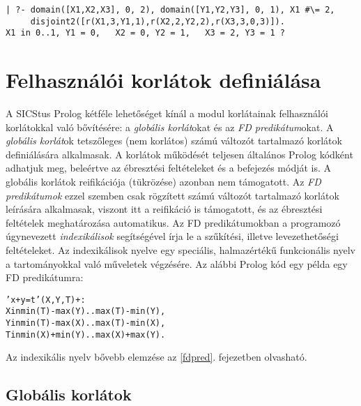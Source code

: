 \begin{verbatim}
| ?- domain([X1,X2,X3], 0, 2), domain([Y1,Y2,Y3], 0, 1), X1 #\= 2,
     disjoint2([r(X1,3,Y1,1),r(X2,2,Y2,2),r(X3,3,0,3)]).
X1 in 0..1, Y1 = 0,   X2 = 0, Y2 = 1,   X3 = 2, Y3 = 1 ?
\end{verbatim}

\section{Felhasználói korlátok definiálása}

A SICStus Prolog kétféle lehetőséget kínál a \clpfd modul korlátainak
felhasználói korlátokkal való bővítésére: a \emph{globális korlát}okat és
az \emph{FD predikátum}okat. A \emph{globális korlát}ok tetszőleges (nem korlátos)
számú változót tartalmazó korlátok definiálására alkalmasak. A korlátok
működését teljesen általános Prolog kódként adhatjuk meg, beleértve az
ébresztési feltételeket és a befejezés módját is. A globális korlátok
reifikációja (tükrözése) azonban nem támogatott. Az \emph{FD predikátumok}
ezzel szemben csak rögzített számú változót tartalmazó korlátok leírására
alkalmasak, viszont itt a reifikáció is támogatott, és az ébresztési
feltételek meghatározása automatikus. Az FD predikátumokban a programozó
úgynevezett \emph{indexikálisok} segítségével írja le a szűkítési, illetve
levezethetőségi feltételeket. Az indexikálisok nyelve egy speciális, halmazértékű
funkcionális nyelv a tartományokkal való műveletek végzésére. Az alábbi
Prolog kód egy példa egy FD predikátumra:

\begin{alltt}
% Az X+Y #= T korlát (intervallum szűkítéssel)
'x+y=t'(X,Y,T) +:
        X in min(T) - max(Y)..max(T) - min(Y),
        Y in min(T) - max(X)..max(T) - min(X),
        T in min(X) + min(Y)..max(X) + max(Y).
\end{alltt}

Az indexikális nyelv bővebb elemzése az \ref{fdpred}. fejezetben olvasható.

\subsection{Globális korlátok}

\label{globalis}

